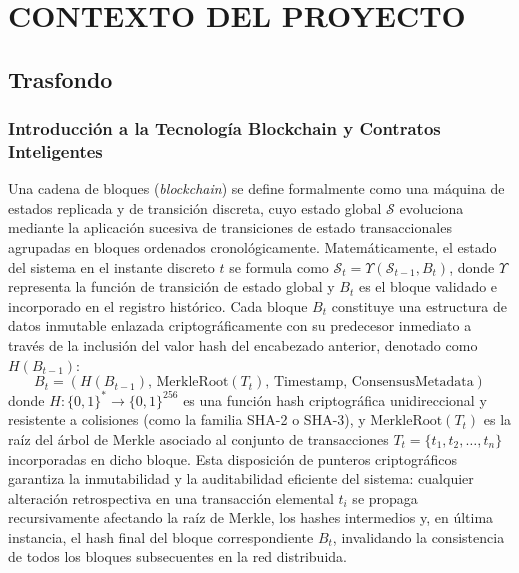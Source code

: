 \newpage
\setcounter{subsection}{0}
\section{CONTEXTO DEL PROYECTO}

\subsection{Trasfondo}

\subsubsection{Introducción a la Tecnología Blockchain y Contratos Inteligentes}

Una cadena de bloques (\textit{blockchain}) se define formalmente como una máquina de estados replicada y de transición discreta, cuyo estado global $\mathcal{S}$ evoluciona mediante la aplicación sucesiva de transiciones de estado transaccionales agrupadas en bloques ordenados cronológicamente. Matemáticamente, el estado del sistema en el instante discreto $t$ se formula como $\mathcal{S}_t = \Upsilon(\mathcal{S}_{t-1}, B_t)$, donde $\Upsilon$ representa la función de transición de estado global y $B_t$ es el bloque validado e incorporado en el registro histórico. Cada bloque $B_t$ constituye una estructura de datos inmutable enlazada criptográficamente con su predecesor inmediato a través de la inclusión del valor hash del encabezado anterior, denotado como $H(B_{t-1})$:
\begin{equation}
B_t = \left( H(B_{t-1}), \, \text{MerkleRoot}(T_t), \, \text{Timestamp}, \, \text{ConsensusMetadata} \right)
\end{equation}
donde $H: \{0,1\}^* \to \{0,1\}^{256}$ es una función hash criptográfica unidireccional y resistente a colisiones (como la familia SHA-2 o SHA-3), y $\text{MerkleRoot}(T_t)$ es la raíz del árbol de Merkle asociado al conjunto de transacciones $T_t = \{t_1, t_2, \dots, t_n\}$ incorporadas en dicho bloque. Esta disposición de punteros criptográficos garantiza la inmutabilidad y la auditabilidad eficiente del sistema: cualquier alteración retrospectiva en una transacción elemental $t_i$ se propaga recursivamente afectando la raíz de Merkle, los hashes intermedios y, en última instancia, el hash final del bloque correspondiente $B_t$, invalidando la consistencia de todos los bloques subsecuentes en la red distribuida.

